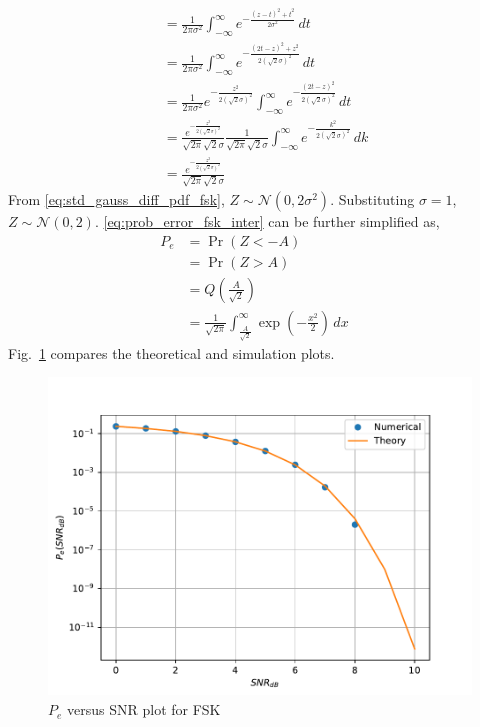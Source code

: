 \documentclass[journal,10pt,twocolumn]{IEEEtran}
\newcommand\figref{Fig.~\ref}
\providecommand{\pr}[1]{\ensuremath{\Pr\left(#1\right)}}
\providecommand{\qfunc}[1]{\ensuremath{Q\left(#1\right)}}
\providecommand{\gauss}[2]{\mathcal{N}\ensuremath{\left(#1,#2\right)}}
\begin{document}
\begin{enumerate}
\begin{align}
	&= \frac{1}{2\pi\sigma^2}\int_{-\infty}^{\infty} e^{-\frac{(z-t)^2+t^2}{2\sigma^2}}  \,dt\\\nonumber
	&= \frac{1}{2\pi\sigma^2}\int_{-\infty}^{\infty} e^{-\frac{(2t-z)^2+z^2}{2(\sqrt{2}\sigma)^2}}  \,dt\\\nonumber
	&= \frac{1}{2\pi\sigma^2}e^{-\frac{z^2}{2(\sqrt{2}\sigma)^2}}\int_{-\infty}^{\infty} e^{-\frac{(2t-z)^2}{2(\sqrt{2}\sigma)^2}}  \,dt\\\nonumber
	&= \frac{e^{-\frac{z^2}{2(\sqrt{2}\sigma)^2}}}{\sqrt{2\pi}\sqrt{2}\sigma} \frac{1}{\sqrt{2\pi}\sqrt{2}\sigma}\int_{-\infty}^{\infty} e^{-\frac{k^2}{2(\sqrt{2}\sigma)^2}}  \,dk\\
	\label{eq:std_gauss_diff_pdf_fsk}
	&= \frac{e^{-\frac{z^2}{2(\sqrt{2}\sigma)^2}}}{\sqrt{2\pi}\sqrt{2}\sigma}
\end{align}
From \eqref{eq:std_gauss_diff_pdf_fsk}, $Z \sim \gauss{0}{2\sigma^2}$. Substituting $\sigma=1$, $Z \sim \gauss{0}{2}$. %
\eqref{eq:prob_error_fsk_inter} can be further simplified as,
\begin{align*}
	P_e &= \pr{Z < -A}&\\
	&= \pr{Z > A}&\\
	&= \qfunc{\frac{A}{\sqrt{2}}}&\\
	&= \frac{1}{\sqrt{2\pi}}\int_{\frac{A}{\sqrt{2}}}^{\infty} \exp\left(-\frac{x^2}{2}\right)  \,dx 
\end{align*}
\figref{fig:biv_pe_snr} compares the theoretical and simulation plots.

\begin{figure}[H]
\centering
\includegraphics[width=\columnwidth]{./figs/chapter5/biv_pe_vs_snr.pdf}
\caption{$P_e$ versus SNR plot for FSK}
\label{fig:biv_pe_snr}
\end{figure}
%
\end{enumerate}
\end{document}
